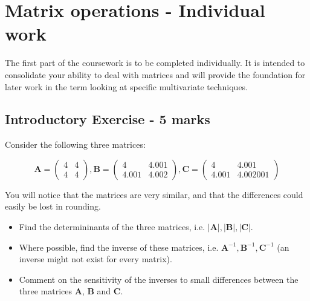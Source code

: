 \documentclass[11pt]{article}
\begin{document}
\section{Matrix operations - Individual work}

The first part of the coursework is to be completed individually.   It is intended to consolidate your ability to deal with matrices and will provide the foundation for later work in the term looking at specific multivariate techniques.   

\subsection{Introductory Exercise - 5 marks}

Consider the following three matrices:


\begin{displaymath}
\boldsymbol{A} = \left( \begin{array}{ll} 4 & 4 \\ 4 & 4\end{array} \right), 
\boldsymbol{B} = \left( \begin{array}{ll} 4 & 4.001 \\ 4.001 & 4.002 \end{array} \right),
\boldsymbol{C} = \left( \begin{array}{ll} 4 & 4.001 \\ 4.001 & 4.002001 \end{array} \right)
\end{displaymath}

You will notice that the matrices are very similar, and that the differences could easily be lost in rounding.

\begin{itemize}
\item Find the determininants of the three matrices, i.e. $|\boldsymbol{A}|, |\boldsymbol{B}|, |\boldsymbol{C}|$.

\item Where possible, find the inverse of these matrices, i.e. $\boldsymbol{A}^{-1}, \boldsymbol{B}^{-1}, \boldsymbol{C}^{-1}$ (an inverse might not exist for every matrix).

\item Comment on the sensitivity of the inverses to small differences between the three matrices $\boldsymbol{A}$,  $\boldsymbol{B}$ and  $\boldsymbol{C}$.

\end{itemize}
\end{document}
